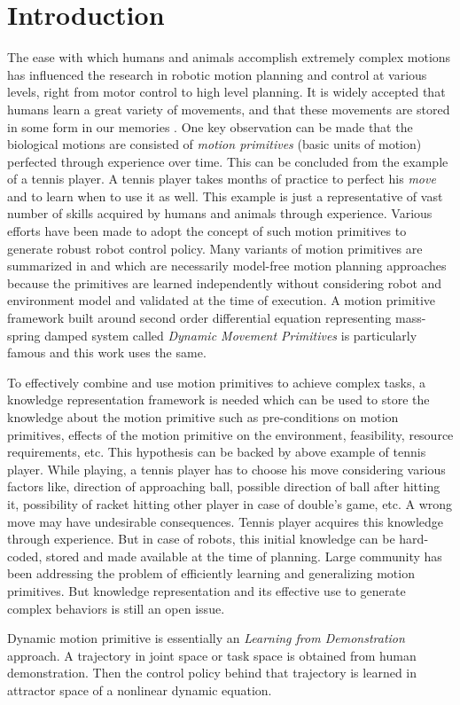 
\chapter{Introduction}

The ease with which humans and animals accomplish extremely complex motions has influenced the research in robotic motion planning and control at various levels, right from motor control to high level planning. It is widely accepted that humans learn a great variety of movements, and that these movements are stored in some form in our memories \cite{lim2005movement}. One key observation can be made that the biological motions are consisted of \textit{motion primitives} (basic units of motion) perfected through experience over time\cite{schaal2006dynamic}. This can be concluded from the example of a tennis player. A tennis player takes months of practice to perfect his \textit{move} and to learn when to use it as well. This example is just a representative of vast number of skills acquired by humans and animals through experience. Various efforts have been made to adopt the concept of such motion primitives to generate robust robot control policy. Many variants of motion primitives are summarized in \cite{kober2013reinforcement} and \cite{deisenroth2013survey} which are necessarily model-free motion planning approaches because the primitives are learned independently without considering robot and environment model and validated at the time of execution. A motion primitive framework built around second order differential equation representing mass-spring damped system called \textit{Dynamic Movement Primitives} is particularly famous and this work uses the same.  

\par To effectively combine and use motion primitives to achieve complex tasks, a knowledge representation framework is needed which can be used to store the knowledge about the motion primitive such as pre-conditions on motion primitives, effects of the motion primitive on the environment, feasibility, resource requirements, etc. This hypothesis can be backed by above example of tennis player. While playing, a tennis player has to choose his move considering various factors like, direction of approaching ball, possible direction of ball after hitting it, possibility of racket hitting other player in case of double's game, etc. A wrong move may have undesirable consequences. Tennis player acquires this knowledge through experience. But in case of robots, this initial knowledge can be hard-coded, stored and made available at the time of planning. Large community has been addressing the problem of efficiently learning and generalizing motion primitives. But knowledge representation and its effective use to generate complex behaviors is still an open issue. 
\par Dynamic motion primitive is essentially an \textit{Learning from Demonstration} approach. A trajectory in joint space or task space is obtained from human demonstration. Then the control policy behind that trajectory is learned in attractor space of a nonlinear dynamic equation.

